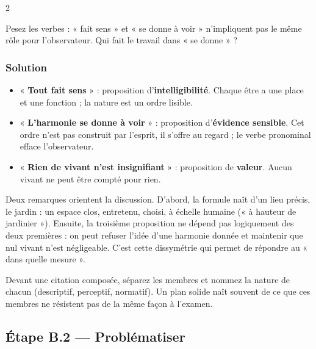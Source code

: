 \documentclass[11pt,a4paper]{article}
\providecommand{\tightlist}{\setlength{\itemsep}{0pt}\setlength{\parskip}{0pt}}
\begin{document}
\begin{indication}{2}

Pesez les verbes : « fait sens » et « se donne à voir » n'impliquent pas le même rôle pour l'observateur. Qui fait le travail dans « se donne » ?

\end{indication}

\hypertarget{solution-3}{%
\subsubsection{Solution}\label{solution-3}}

\begin{itemize}
\tightlist
\item
  « \textbf{Tout fait sens} » : proposition d'\textbf{intelligibilité}. Chaque être a une place et une fonction ; la nature est un ordre lisible.
\item
  « \textbf{L'harmonie se donne à voir} » : proposition d'\textbf{évidence sensible}. Cet ordre n'est pas construit par l'esprit, il s'offre au regard ; le verbe pronominal efface l'observateur.
\item
  « \textbf{Rien de vivant n'est insignifiant} » : proposition de \textbf{valeur}. Aucun vivant ne peut être compté pour rien.
\end{itemize}

Deux remarques orientent la discussion. D'abord, la formule naît d'un lieu précis, le jardin : un espace clos, entretenu, choisi, à échelle humaine (« à hauteur de jardinier »). Ensuite, la troisième proposition ne dépend pas logiquement des deux premières : on peut refuser l'idée d'une harmonie donnée et maintenir que nul vivant n'est négligeable. C'est cette dissymétrie qui permet de répondre au « dans quelle mesure ».

\begin{methode}

Devant une citation composée, séparez les membres et nommez la nature de chacun (descriptif, perceptif, normatif). Un plan solide naît souvent de ce que ces membres ne résistent pas de la même façon à l'examen.

\end{methode}

\hypertarget{uxe9tape-b.2-probluxe9matiser}{%
\subsection{Étape B.2 --- Problématiser}\label{uxe9tape-b.2-probluxe9matiser}}
\end{document}
